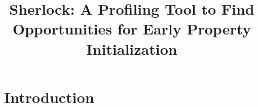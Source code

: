 \documentclass[authoryear,preprint]{sigplanconf}
\begin{document}
\setlength{\pdfpageheight}{\paperheight}
\setlength{\pdfpagewidth}{\paperwidth}


\title{Sherlock: A Profiling Tool to Find Opportunities for Early Property Initialization}


\maketitle

\begin{abstract}
\blindtext %
\end{abstract}


\section{Introduction}
\label{sec:introduction}










\end{document}
